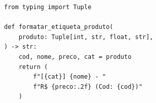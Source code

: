 \ifmostrarGabarito
\begin{verbatim}
from typing import Tuple

def formatar_etiqueta_produto(
    produto: Tuple[int, str, float, str],
) -> str:
    cod, nome, preco, cat = produto
    return (
        f"[{cat}] {nome} - "
        f"R$ {preco:.2f} (Cod: {cod})"
    )
\end{verbatim}

\fi

